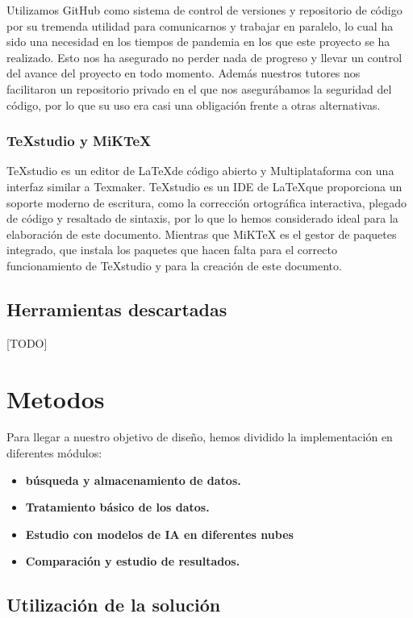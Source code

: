 Utilizamos GitHub como sistema de control de versiones y repositorio de código por su tremenda utilidad para comunicarnos y trabajar en paralelo, lo cual ha sido una necesidad en los tiempos de pandemia en los que este proyecto se ha realizado. Esto nos ha asegurado no perder nada de progreso y llevar un control del avance del proyecto en todo momento. Además nuestros tutores nos facilitaron un repositorio privado en el que nos asegurábamos la seguridad del código, por lo que su uso era casi una obligación frente a otras alternativas.

\subsubsection*{TeXstudio y MiKTeX}
TeXstudio es un editor de \LaTeX\space de código abierto y Multiplataforma con una interfaz similar a Texmaker. TeXstudio es un IDE de \LaTeX\space que proporciona un soporte moderno de escritura, como la corrección ortográfica interactiva, plegado de código y resaltado de sintaxis, por lo que lo hemos considerado ideal para la elaboración de este documento.
Mientras que MiKTeX es el gestor de paquetes integrado, que instala los paquetes que hacen falta para el correcto funcionamiento de TeXstudio y para la creación de este documento.

\subsection{Herramientas descartadas} 

[TODO]

\section{Metodos}

Para llegar a nuestro objetivo de diseño, hemos dividido la implementación en diferentes módulos:

\begin{itemize}
	\item \textbf{ búsqueda y almacenamiento de datos.}
	\item \textbf{ Tratamiento básico de los datos.}
	\item \textbf{ Estudio con modelos de IA en diferentes nubes}
	\item \textbf{ Comparación y estudio de resultados.}
\end{itemize}

\subsection{Utilización de la solución}
